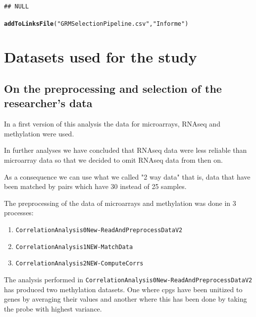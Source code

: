 \documentclass[a4paper,10pt]{article}\usepackage[]{graphicx}\usepackage[]{color}
\makeatletter
\newcommand{\hlstr}[1]{\textcolor[rgb]{0.192,0.494,0.8}{#1}}%
\newcommand{\hlstd}[1]{\textcolor[rgb]{0.345,0.345,0.345}{#1}}%
\newcommand{\hlkwd}[1]{\textcolor[rgb]{0.737,0.353,0.396}{\textbf{#1}}}%
\newenvironment{kframe}{%
 \def\at@end@of@kframe{}%
 \ifinner\ifhmode%
  \def\at@end@of@kframe{\end{minipage}}%
  \begin{minipage}{\columnwidth}%
 \fi\fi%
 \def\FrameCommand##1{\hskip\@totalleftmargin \hskip-\fboxsep
 \colorbox{shadecolor}{##1}\hskip-\fboxsep
     \hskip-\linewidth \hskip-\@totalleftmargin \hskip\columnwidth}%
 \MakeFramed {\advance\hsize-\width
   \@totalleftmargin\z@ \linewidth\hsize
   \@setminipage}}%
 {\par\unskip\endMakeFramed%
 \at@end@of@kframe}
\newenvironment{knitrout}{}{} %
\makeatother
\begin{document}
\begin{knitrout}
\color{fgcolor}\begin{kframe}
\begin{verbatim}
## NULL
\end{verbatim}
\end{kframe}
\end{knitrout}



\begin{knitrout}
\color{fgcolor}\begin{kframe}
\begin{alltt}
\hlkwd{addToLinksFile}\hlstd{(}\hlstr{"GRMSelectionPipeline.csv"}\hlstd{,} \hlstr{"Informe"}\hlstd{)}
\end{alltt}
\end{kframe}
\end{knitrout}

\section{Datasets used for the study}

\subsection{On the preprocessing and selection of the researcher's data}

In a first version of this analysis the data for microarrays, RNAseq and methylation were used. 

In further analyses we have concluded that RNAseq data were less reliable than microarray data so that we decided to omit RNAseq data from then on. 

As a consequence we can use what we called "2 way data" that is, data that have been matched by pairs which have 30 instead of 25 samples.

The preprocessing of the data of microarrays and methylation was done in 3 processes:
\begin{enumerate}
\item \texttt{CorrelationAnalysis0New-ReadAndPreprocessDataV2}
\item  \texttt{CorrelationAnalysis1NEW-MatchData}
\item \texttt{CorrelationAnalysis2NEW-ComputeCorrs}
\end{enumerate}

The analysis performed in \texttt{CorrelationAnalysis0New-ReadAndPreprocessDataV2} has produced two methylation datasets. One where cpgs have been unitized to genes by averaging their values and another where this has been done by taking the probe with highest variance.
\end{document}
